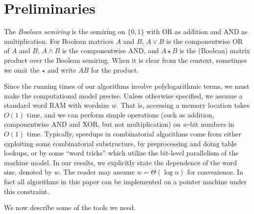 \section{Preliminaries}
The \emph{Boolean semiring} is the semiring on $\{0,1\}$ with OR as addition and AND as multiplication. For Boolean matrices $A$ and $B$, $A \vee B$ is the componentwise OR of $A$ and $B$, $A \wedge B$ is the componentwise AND, and $A \star B$ is the (Boolean) matrix product over the Boolean semiring. When it is clear from the context, sometimes we omit the $\star$ and write $A B$ for the product.

Since the running times of our algorithms involve polylogarithmic terms, we must make the computational model precise. Unless otherwise specified, we assume a standard word RAM with wordsize $w$. That is, accessing a memory location takes $O(1)$ time, and we can perform simple operations (such as addition, componentwise AND and XOR, but not multiplication) on $w$-bit numbers in $O(1)$ time.
Typically, speedups in combinatorial algorithms come from either exploiting some combinatorial substructure, by preprocessing and doing table lookups, or by some ``word tricks'' which utilize the bit-level parallelism of the machine model.
In our results, we explicitly state the dependence of the word size, denoted by $w$. The reader may assume $w = \Theta(\log n)$ for convenience. In fact all algorithms in this paper can be implemented on a pointer machine under this constraint.

We now describe some of the tools we need.

